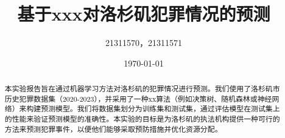 \documentclass{article}
\begin{document}
\title{基于xxx对洛杉矶犯罪情况的预测}
\author{21311570，21311571}
\date{\today}

\maketitle

\renewcommand{\abstractname}{摘要}  %

\begin{abstract}
    本实验报告旨在通过机器学习方法对洛杉矶的犯罪情况进行预测。我们使用了洛杉矶市历史犯罪数据集（2020-2023），并采用了一种xx算法（例如决策树、随机森林或神经网络）来构建预测模型。我们将数据集划分为训练集和测试集，通过评估模型在测试集上的性能来验证预测模型的准确性。本实验的目标是为洛杉矶的执法机构提供一种可行的方法来预测犯罪事件，以便他们能够采取预防措施并优化资源分配。
\end{abstract}
\end{document}

